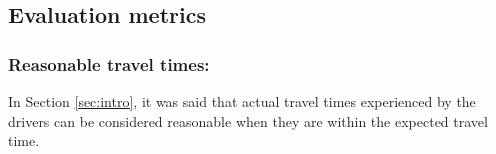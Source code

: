 \documentclass[12pt]{llncs}
\newcommand{\reward}[1][]{\ensuremath{R_#1}}	%
\begin{document}




% 
% 
% 

\subsection{Evaluation metrics}

\subsubsection{Reasonable travel times:}
In Section \ref{sec:intro}, it was said that actual travel times experienced by the drivers can be considered reasonable when they are within the expected travel time.
\end{document}
